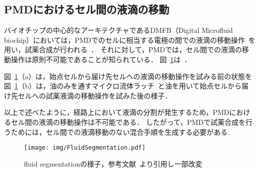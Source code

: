 \subsection{PMDにおけるセル間の液滴の移動}
バイオチップの中心的なアーキテクチャであるDMFB（Digital Microfluid biochip）においては，PMDでのセルに相当する電極の間での液滴の移動操作~\cite{B110474H}を用い，試薬合成が行われる~\cite{5605330}\cite{10.1007/s11047-006-9032-6}\cite{10.1145/2429384.2429464}．
それに対して，PMDでは，セル間での液滴の移動操作は原則不可能であることが知られている．
図~\ref{fig:fluidseg}は~\cite{4}． 

図~\ref{fig:fluidseg}（a）は，始点セルから届け先セルへの液滴の移動操作を試みる前の状態を
図~\ref{fig:fluidseg}（b）は，油のみを通すマイクロ流体ラッチ~\cite{urbanski2006digital}と油を用いて始点セルから届け先セルへの試薬液滴の移動操作を試みた後の様子．

以上で述べたように，経路上において液滴の分割が発生するため，PMDにおけるセル間の液滴の移動操作は不可能である．
したがって，PMDで試薬合成を行うためには，セル間での液滴移動のない混合手順を生成する必要がある.
\begin{figure}[tbp]
    \centering\texttt{[image: img/FluidSegmentation.pdf]}
 \caption{fluid segmentationの様子，参考文献~\cite{4}より引用し一部改変}\label{fig:fluidseg}
\end{figure}
\newpage
